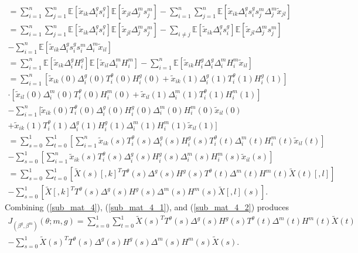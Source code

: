 \documentclass[12pt]{article}
\begin{document}
\begin{appendices}
\begin{refsection}
\begin{multline}
		= \sum_{i=1}^n \sum_{j=1}^n \mathbb{E}[\tilde{x}_{ik} \Delta^g_is^g_i] \mathbb{E}[ \tilde{x}_{jl} \Delta^m_j s^m_j ] - \sum_{i=1}^n \sum_{j=1}^n \mathbb{E}[ \tilde{x}_{ik} \Delta^g_i s^g_i s^m_j \Delta^m_j \tilde{x}_{jl}]  \\
		= \sum_{i=1}^n \sum_{j=1}^n \mathbb{E}[ \tilde{x}_{ik} \Delta^g_i s^g_i] \mathbb{E} \left[\tilde{x}_{jl} \Delta^m_j s^m_j \right]  - \sum_{i \neq j} \mathbb{E}[\tilde{x}_{ik} \Delta^g_i s^g_i] \mathbb{E}[\tilde{x}_{jl}\Delta^m_j  s^m_j ] \\ - \sum_{i=1}^n \mathbb{E}[\tilde{x}_{ik} \Delta^g_i s^g_i s^m_i \Delta^m_i \tilde{x}_{il}] \\
		= \sum_{i=1}^n \mathbb{E}[\tilde{x}_{ik} \Delta^g_i H^g_i] \mathbb{E}[\tilde{x}_{il} \Delta_i^m H^m_i] - \sum_{i=1}^n \mathbb{E}[\tilde{x}_{ik} H_i^g \Delta_i^g \Delta_i^m H_i^m \tilde{x}_{il}] \\ 
		= \sum_{i=1}^n \left[\tilde{x}_{ik}(0) {\Delta}^g_i(0) T^\theta_i(0) {H}^g_i(0) + \tilde{x}_{ik}(1) {\Delta}^g_i(1) T^\theta_i(1) {H}^g_i(1)\right] \\ 
		\cdot \left[\tilde{x}_{il}(0) {\Delta}^m_i(0) T^\theta_i(0) {H}^m_i(0) + \tilde{x}_{il}(1) {\Delta}^m_i(1) T^\theta_i(1) {H}^m_i(1)\right] 
		\\ - \sum_{i=1}^n [\tilde{x}_{ik}(0) T^\theta_i(0) {\Delta}^g_i(0) {H}^g_i(0) {\Delta}^m_i(0) {H}^m_i(0) \tilde{x}_{il}(0) \\ + \tilde{x}_{ik}(1) T^\theta_i(1) {\Delta}^g_i(1) {H}^g_i(1) {\Delta}^m_i(1) {H}^m_i(1) \tilde{x}_{il}(1) ] 
		\\ = \sum_{s=0}^1 \sum_{t=0}^1 \left[\sum_{i=1}^n \tilde{x}_{ik}(s) T^\theta_i(s) {\Delta}^g_i(s) {H}^g_i(s) T^\theta_i(t){\Delta}^m_i(t) {H}^m_i(t) \tilde{x}_{il}(t) \right]
		\\ - \sum_{s=0}^1 \left[\sum_{i=1}^n \tilde{x}_{ik}(s) T^\theta_i(s) {\Delta}^g_i(s) {H}^g_i(s) {\Delta}^m_i(s) {H}^m_i(s) \tilde{x}_{il}(s)\right] 
		\\ = \sum_{s=0}^1 \sum_{t=0}^1 \left[ \tilde{X}(s)[,k]^T T^\theta(s) {\Delta}^g(s) {H}^g(s) T^\theta(t){\Delta}^m(t) {H}^m(t) \tilde{X}(t)[,l] \right]\\ - \sum_{s=0}^1 \left[ \tilde{X}[,k]^T T^\theta(s) {\Delta}^g(s) {H}^g(s) {\Delta}^m(s) {H}^m(s) \tilde{X}[,l](s)\right].
		\end{multline}
		Combining (\ref{sub_mat_4}), (\ref{sub_mat_4_1}), and (\ref{sub_mat_4_2}) produces
		\begin{multline}\label{sub_mat_4_formula}
		J_{(\beta^g, \beta^m)}(\theta; m, g) = \sum_{s=0}^1 \sum_{t=0}^1 \tilde{X}(s)^T  T^\theta(s) {\Delta}^g(s) {H}^g(s) T^\theta(t){\Delta}^m(t) {H}^m(t) \tilde{X}(t) \\ - \sum_{s=0}^1 \tilde{X}(s)^T T^\theta(s) {\Delta}^g(s) {H}^g(s) {\Delta}^m(s) {H}^m(s) \tilde{X}(s).
		\end{multline}

\end{refsection}
\end{appendices}
\end{document}
